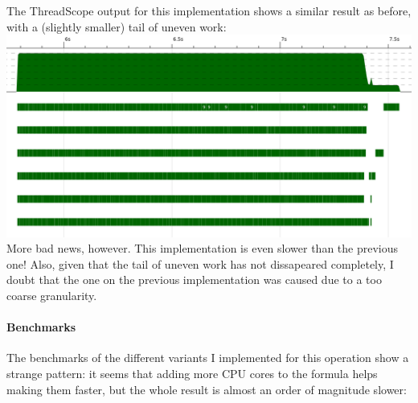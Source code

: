 \documentclass[a4paper,10pt]{article}
\begin{document}
The ThreadScope output for this implementation shows a similar result as before,
with a (slightly smaller) tail of uneven work:\\

\includegraphics[scale=0.3]{threadscope/ParMerge3}\\

More bad news, however. This implementation is even slower than the previous
one!
%
Also, given that the tail of uneven work has not dissapeared completely, I doubt
that the one on the previous implementation was caused due to a too coarse
granularity.

\paragraph{Benchmarks}

The benchmarks of the different variants I implemented for this operation show a
strange pattern: it seems that adding more CPU cores to the formula helps making
them faster, but the whole result is almost an order of magnitude slower:\\
\end{document}
